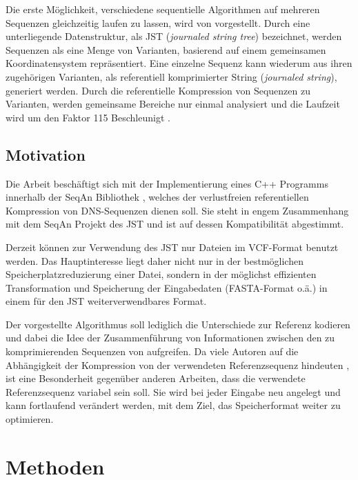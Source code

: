 \documentclass[12pt]{article}
\begin{document}
Die erste Möglichkeit, verschiedene sequentielle Algorithmen auf mehreren Sequenzen gleichzeitig laufen zu lassen, wird von \cite{Rahn15072014} vorgestellt. Durch eine unterliegende Datenstruktur, als JST (\textit{journaled string tree}) bezeichnet, werden Sequenzen als eine Menge von Varianten, basierend auf einem gemeinsamen Koordinatensystem repräsentiert. Eine einzelne Sequenz kann wiederum aus ihren zugehörigen Varianten, als referentiell komprimierter String (\textit{journaled string}), generiert werden. Durch die referentielle Kompression von Sequenzen zu Varianten, werden gemeinsame Bereiche nur einmal analysiert und die Laufzeit wird um den Faktor 115 Beschleunigt \cite{Rahn15072014}.

\subsection{Motivation}
Die Arbeit beschäftigt sich mit der Implementierung eines C++ Programms innerhalb der SeqAn Bibliothek \cite{doering08seqan}, welches der verlustfreien referentiellen Kompression von DNS-Sequenzen dienen soll. Sie steht in engem Zusammenhang mit dem SeqAn Projekt des JST \cite{Rahn15072014} und ist auf dessen Kompatibilität abgestimmt.

Derzeit können zur Verwendung des JST nur Dateien im VCF-Format benutzt werden. Das Hauptinteresse liegt daher nicht nur in der bestmöglichen Speicherplatzreduzierung einer Datei, sondern in der möglichst effizienten Transformation und Speicherung der Eingabedaten (FASTA-Format o.ä.) in einem für den JST weiterverwendbares Format. 

Der vorgestellte Algorithmus soll lediglich die Unterschiede zur Referenz kodieren und dabei die Idee der Zusammenführung von Informationen zwischen den zu komprimierenden Sequenzen von \cite{deoriwicz:GDC,deoriwicz:GDC2} aufgreifen. Da viele Autoren auf die Abhängigkeit der Kompression von der verwendeten Referenzsequenz hindeuten \cite{deorowicz13info,wandelt14trends,kuruppu:refseq}, ist eine Besonderheit gegenüber anderen Arbeiten, dass die verwendete Referenzsequenz variabel sein soll. Sie wird bei jeder Eingabe neu angelegt und kann fortlaufend verändert werden, mit dem Ziel, das Speicherformat weiter zu optimieren.

\section{Methoden}
\end{document}
